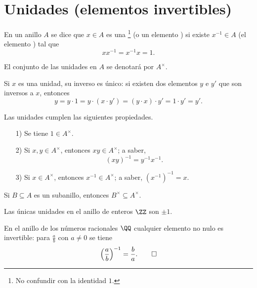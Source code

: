 
\section{Unidades (elementos invertibles)}

\begin{definicion}
  En un anillo $A$ se dice que $x\in A$ es una
  \footnote{No confundir con la identidad $1$.} (o un elemento
  ) si existe $x^{-1} \in A$ (el elemento )
  tal que
  $$xx^{-1} = x^{-1}x = 1.$$

  El conjunto de las unidades en $A$ se denotará por $A^\times$.
\end{definicion}

Si $x$ es una unidad, su inverso es único: si existen dos elementos $y$ e $y'$
que son inversos a $x$, entonces
$$y = y\cdot 1 = y\cdot (x\cdot y') = (y\cdot x)\cdot y' = 1\cdot y' = y'.$$

\begin{observacionejerc}
  Las unidades cumplen las siguientes propiedades.

  \begin{enumerate}
  \item[1)] Se tiene $1 \in A^\times$.

  \item[2)] Si $x,y \in A^\times$, entonces $xy \in A^\times$; a saber,
    $$(xy)^{-1} = y^{-1} x^{-1}.$$

  \item[3)] Si $x \in A^\times$, entonces $x^{-1} \in A^\times$; a saber, $(x^{-1})^{-1} = x$. \qedhere
  \end{enumerate}
\end{observacionejerc}

\begin{observacionejerc}
  Si $B\subseteq A$ es un subanillo, entonces $B^\times \subseteq A^\times$.
\end{observacionejerc}

\begin{ejemplo}
  Las únicas unidades en el anillo de enteros $\ZZ$ son $\pm 1$.
\end{ejemplo}

\begin{ejemplo}
  En el anillo de los números racionales $\QQ$ cualquier elemento no nulo es
  invertible: para $\frac{a}{b}$ con $a \ne 0$ se tiene
  \[ \left(\frac{a}{b}\right)^{-1} = \frac{b}{a}. \qedhere \]
\end{ejemplo}

